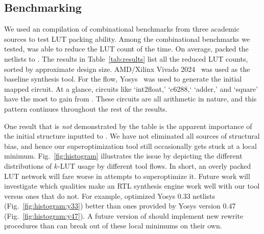 \subsection{Benchmarking}\label{sec:results:benchmark}

We used an compilation of \nbenchmarks{} combinational benchmarks from three
academic sources to test LUT packing ability. Among the combinational
benchmarks we tested, \shortname{} was able to reduce the LUT count \fmetric{}
of the time. On average, \shortname{} packed the netlists to \metric{}. The
results in Table~\ref{tab:results} list all the reduced LUT counts, sorted by
approximate design size. AMD/Xilinx Vivado 2024~\cite{vivado} was used as the
baseline synthesis tool. For the \shortname{} flow, Yosys~\cite{yosys} was used
to generate the initial mapped circuit. At a glance, circuits like `int2float,'
`c6288,` `adder,' and `square' have the most to gain from \shortname{}. These
circuits are all arithmetic in nature, and this pattern continues throughout
the rest of the results.

One result that is \textit{not} demonstrated by the table is the apparent
importance of the initial structure inputted to \shortname{}. We have not
eliminated all sources of structural bias, and hence our superoptimization tool
still occasionally gets stuck at a local minimum. Fig.~\ref{fig:histogram}
illustrates the issue by depicting the different distributions of $k$-LUT usage
by different tool flows. In short, an overly packed LUT network will fare worse
in attempts to superoptimize it. Future work will investigate which qualities
make an RTL synthesis engine work well with our tool versus ones that do not.
For example, \shortname{} optimized Yosys 0.33 netlists
(Fig.~\ref{fig:histogram:y33}) better than ones provided by Yosys version 0.47
(Fig.~\ref{fig:histogram:y47}). A future version of \shortname{} should
implement new rewrite procedures than can break out of these local minimums on
their own.

